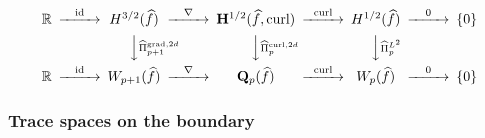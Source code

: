 \documentclass{article}
\newcommand{\hatPicurlcomtwod}{\widehat \Pi^{\operatorname*{curl},2d}_p}
\newcommand{\hatPigradcomtwod}{\widehat\Pi^{\operatorname*{grad},2d}_{p+1}}
\begin{document}
\begin{equation}
\begin{CD} \mathbb{R} @> \operatorname*{id} >> H^{3/2}(\widehat f) @> \nabla >> \mathbf{H}^{1/2}(\widehat f, \operatorname*{curl}) @> \operatorname*{curl} >> H^{1/2}(\widehat f) @> \operatorname*{0} >> \{0\}\\ @. @VV \hatPigradcomtwod V @VV \hatPicurlcomtwod V @VV \widehat \Pi^{L^2}_p V \\ \mathbb{R} @> \operatorname*{id} >> W_{p+1}(\widehat f) @> \nabla >> {\mathbf Q}_p(\widehat f) @> \operatorname*{curl} >> W_p(\widehat f) @> \operatorname*{0} >>\{0\}\end{CD} \label{eq:commuting-diagram-2d}
\end{equation}

\subsubsection{Trace spaces on the boundary}
\label{sec:trace_spaces}

\end{document}
